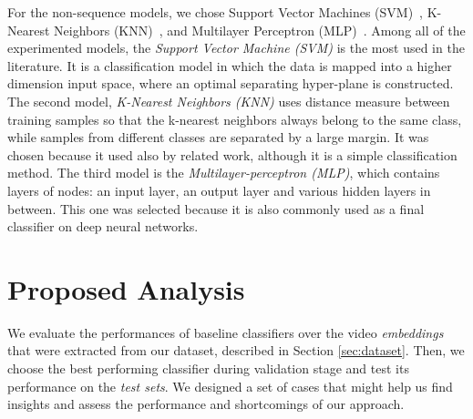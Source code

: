 For the non-sequence models, we chose Support Vector Machines (SVM)~\cite{cortes1995support}, K-Nearest Neighbors (KNN)~\cite{peterson2009k}, and Multilayer Perceptron (MLP)~\cite{haykin2009neural}.
Among all of the experimented models, the \textit{Support Vector Machine (SVM)} is the most used in the literature.
It is a classification model in which the data is mapped into a higher dimension input space, where an optimal separating hyper-plane is constructed.
The second model, \textit{K-Nearest Neighbors (KNN)} uses distance measure between training samples so that the k-nearest neighbors always belong to the same class, while samples from different classes are separated by a large margin. 
It was chosen because it used also by related work, although it is a simple classification method.
The third model is the \textit{Multilayer-perceptron (MLP)}, which contains layers of nodes: an input layer, an output layer and various hidden layers in between. 
This one was selected because it is also commonly used as a final classifier on deep neural networks.  

%
\section{Proposed Analysis}\label{sec:experiments}

We evaluate the performances of baseline classifiers over the video \textit{embeddings} that were extracted from our dataset, described in Section \ref{sec:dataset}. Then, we choose the best performing classifier during validation stage and test its performance on the \textit{test sets}.  
We designed a set of cases that might help us find insights and assess the performance and shortcomings of our approach.  

